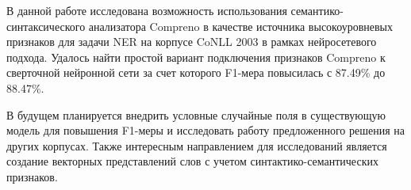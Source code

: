 \Conclusion %

В данной работе исследована возможность использования семантико-синтаксического
анализатора Compreno в качестве источника высокоуровневых признаков для задачи
NER на корпусе CoNLL 2003 в рамках нейросетевого подхода.
Удалось найти простой вариант подключения признаков Compreno к сверточной нейронной
сети за счет которого F1-мера повысилась с 87.49\% до 88.47\%.

В будущем планируется внедрить условные случайные поля в существующую модель для
повышения F1-меры и исследовать работу предложенного решения на других корпусах.
Также интересным направлением для исследований является создание
векторных представлений слов с учетом синтактико-семантических признаков.


